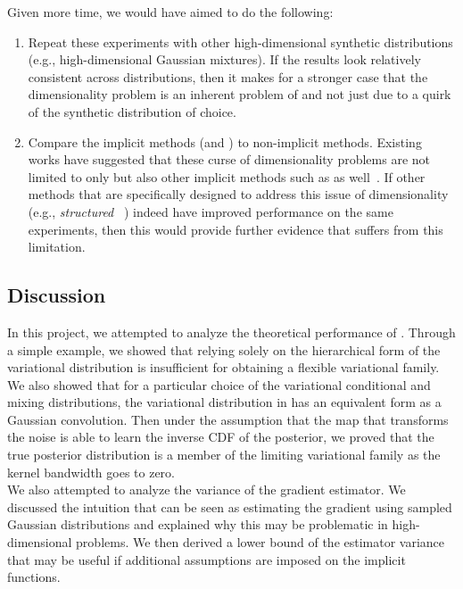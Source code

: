 \documentclass[10pt]{article}
\begin{document}
Given more time, we would have aimed to do the following:
\begin{enumerate}

\item
Repeat these experiments with other high-dimensional synthetic distributions (e.g., high-dimensional Gaussian mixtures). If the results look relatively consistent across distributions, then it makes for a stronger case that the dimensionality problem is an inherent problem of \uivi and not just due to a quirk of the synthetic distribution of choice.

\item
Compare the implicit \vi methods (\uivi and \sivi) to non-implicit \vi methods. Existing works have suggested that these curse of dimensionality problems are not limited to only \uivi but also other implicit \vi methods such as \sivi as well~\citep{Molchanova:2019,Moens:2021}. If other methods that are specifically designed to address this issue of dimensionality (e.g., \textit{structured} \sivi~\citep{Molchanova:2019}) indeed have improved performance on the same experiments, then this would provide further evidence that \uivi suffers from this limitation.

\end{enumerate}


\subsection{Discussion} \label{sec:discussion}

In this project, we attempted to analyze the theoretical performance of \uivi. Through a simple example, we showed that relying solely on the hierarchical form of the variational distribution is insufficient for obtaining a flexible variational family. We also showed that for a particular choice of the variational conditional and mixing distributions, the variational distribution in \uivi has an equivalent form as a Gaussian convolution. Then under the assumption that the map that transforms the noise is able to learn the inverse CDF of the posterior, we proved that the true posterior distribution is a member of the limiting variational family as the kernel bandwidth goes to zero.
\\

We also attempted to analyze the variance of the \elbo gradient estimator. We discussed the intuition that \uivi can be seen as estimating the \elbo gradient using sampled Gaussian distributions and explained why this may be problematic in high-dimensional problems. We then derived a lower bound of the estimator variance that may be useful if additional assumptions are imposed on the implicit functions.
\\
\end{document}
